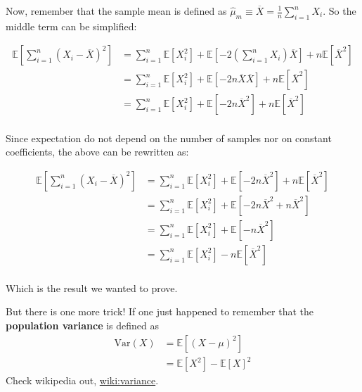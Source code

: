 Now, remember that the sample mean is defined as
$\hat{\mu}_m \equiv \overline{X} = \frac{1}{n} \sum_{i=1}^{n} X_i$.
So the middle term can be simplified:

\begin{align*}
\mathbb{E} \left[ \sum_{i=1}^{n} \left( X_i - \overline{X} \right)^2 \right]
&= \sum_{i=1}^{n} \mathbb{E}\left[ X_{i}^2 \right]
    + \mathbb{E}\left[ -2 \left( \sum_{i=1}^{n} X_i \right) \overline{X} \right] 
    + n \mathbb{E}\left[ \overline{X}^2 \right] \\
&= \sum_{i=1}^{n} \mathbb{E}\left[ X_{i}^2 \right]
    + \mathbb{E}\left[ -2 n \overline{X} \overline{X} \right] 
    + n \mathbb{E}\left[ \overline{X}^2 \right] \\
&= \sum_{i=1}^{n} \mathbb{E}\left[ X_{i}^2 \right]
    + \mathbb{E}\left[ -2 n \overline{X}^2 \right] 
    + n \mathbb{E}\left[ \overline{X}^2 \right] \\
\end{align*}

Since expectation do not depend on the number of samples nor on constant coefficients, the above can be rewritten
as:

\begin{align*}
\mathbb{E} \left[ \sum_{i=1}^{n} \left( X_i - \overline{X} \right)^2 \right]
    &= \sum_{i=1}^{n} \mathbb{E}\left[ X_{i}^2 \right]
        + \mathbb{E}\left[ -2 n \overline{X}^2 \right] 
        + n \mathbb{E}\left[ \overline{X}^2 \right] \\
&= \sum_{i=1}^{n} \mathbb{E}\left[ X_{i}^2 \right] 
    + \mathbb{E}\left[ -2 n \overline{X}^2 + n \overline{X}^2 \right] \\
&= \sum_{i=1}^{n} \mathbb{E}\left[ X_{i}^2 \right]
    + \mathbb{E}\left[ - n \overline{X}^2 \right] \\
&= \sum_{i=1}^{n} \mathbb{E}\left[ X_{i}^2 \right]
    - n \mathbb{E}\left[\overline{X}^2 \right] \\
\end{align*}

Which is the result we wanted to prove.

But there is one more trick!
If one just happened to remember that the \textbf{population variance} is defined as
\begin{align*}
\text{Var}(X) &= \mathbb{E}\left[ \left(X - \mu\right)^2 \right] \\
&= \mathbb{E}\left[ X^2 \right] - \mathbb{E}\left[ X \right]^2
\end{align*}
Check wikipedia out,
\href{https://en.wikipedia.org/wiki/Variance}{wiki:variance}.

